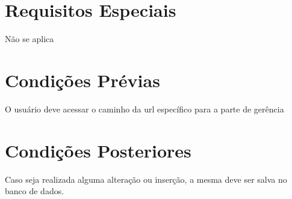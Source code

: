 \section{Requisitos Especiais}

Não se aplica

\section{Condições Prévias}

O usuário deve acessar o caminho da url específico para a parte de gerência

\section{Condições Posteriores}

Caso seja realizada alguma alteração ou inserção, a mesma deve ser salva no banco de dados.